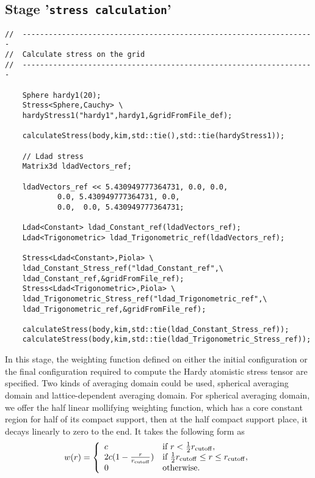 \documentclass[authoryear]{elsarticle}
\newcommand{\ttt}{\texttt}
\begin{document}
\subsection{Stage \textnormal{'\ttt{stress calculation}'}}
\begin{Verbatim}[frame=single]
//	-------------------------------------------------------------------
//	Calculate stress on the grid
//	-------------------------------------------------------------------

	Sphere hardy1(20);
	Stress<Sphere,Cauchy> \
	hardyStress1("hardy1",hardy1,&gridFromFile_def);

	calculateStress(body,kim,std::tie(),std::tie(hardyStress1));

	// Ldad stress
	Matrix3d ldadVectors_ref;

	ldadVectors_ref << 5.430949777364731, 0.0, 0.0, 
			0.0, 5.430949777364731, 0.0,
			0.0,  0.0, 5.430949777364731;   

	Ldad<Constant> ldad_Constant_ref(ldadVectors_ref);
	Ldad<Trigonometric> ldad_Trigonometric_ref(ldadVectors_ref);

	Stress<Ldad<Constant>,Piola> \
	ldad_Constant_Stress_ref("ldad_Constant_ref",\
	ldad_Constant_ref,&gridFromFile_ref);
	Stress<Ldad<Trigonometric>,Piola> \
	ldad_Trigonometric_Stress_ref("ldad_Trigonometric_ref",\
	ldad_Trigonometric_ref,&gridFromFile_ref);

	calculateStress(body,kim,std::tie(ldad_Constant_Stress_ref));
	calculateStress(body,kim,std::tie(ldad_Trigonometric_Stress_ref));
\end{Verbatim}

In this stage, the weighting function defined on either the initial configuration or the final configuration required to compute the Hardy atomistic stress tensor are specified.
Two kinds of averaging domain could be used, spherical averaging domain and lattice-dependent averaging domain.
For spherical averaging domain, we offer the half linear mollifying weighting function, which has a core constant region for half of its compact support, then at the half compact support place, it decays linearly to zero to the end. It takes the following form as
\begin{equation}
\label{eqn:linear_molly}
w(r) = \left \{ \begin{array}{ll}
c & \mbox{if $r<\frac{1}{2}r_{\rm{cutoff}} $}, \\
2c(1-\frac{r}{r_{\rm{cutoff}}}) &
\mbox{if $\frac{1}{2}r_{\rm{cutoff}}\le r \le r_{\rm{cutoff}}$}, \\
0 & \mbox{otherwise}. \end{array} \right.
\end{equation}
\end{document}
